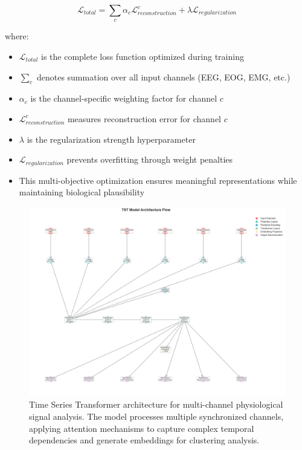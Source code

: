 \documentclass[a4paper,12pt,twoside]{article}
\begin{document}
$$\mathcal{L}_{total} = \sum_{c} \alpha_c \mathcal{L}_{reconstruction}^c + \lambda \mathcal{L}_{regularization}$$

where:
\begin{itemize}
    \item $\mathcal{L}_{total}$ is the complete loss function optimized during training
    \item $\sum_{c}$ denotes summation over all input channels (EEG, EOG, EMG, etc.)
    \item $\alpha_c$ is the channel-specific weighting factor for channel $c$
    \item $\mathcal{L}_{reconstruction}^c$ measures reconstruction error for channel $c$
    \item $\lambda$ is the regularization strength hyperparameter
    \item $\mathcal{L}_{regularization}$ prevents overfitting through weight penalties
    \item This multi-objective optimization ensures meaningful representations while maintaining biological plausibility
\end{itemize}

\begin{figure}[H]
\centering
\includegraphics[width=1.2\textwidth]{img/tst model architecture.png}
\caption{Time Series Transformer architecture for multi-channel physiological signal analysis. The model processes multiple synchronized channels, applying attention mechanisms to capture complex temporal dependencies and generate embeddings for clustering analysis.}
\label{fig:tst_model_architecture}
\end{figure}
\end{document}
